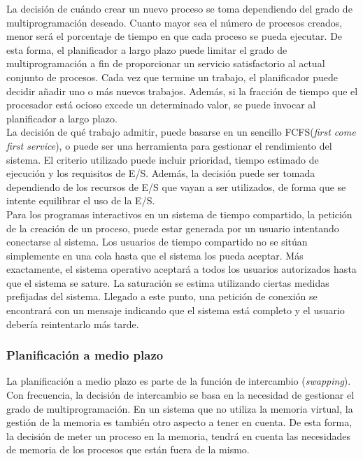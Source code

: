 \documentclass{article}
\begin{document}
				La decisión de cuándo crear un nuevo proceso se toma dependiendo del grado de multiprogramación deseado. Cuanto mayor sea el número de procesos creados, menor será el porcentaje de tiempo en que cada proceso se pueda ejecutar. De esta forma, el planificador a largo plazo puede limitar el grado de multiprogramación a fin de proporcionar un servicio satisfactorio al actual conjunto de procesos. Cada vez que termine un trabajo, el planificador puede decidir añadir uno o más nuevos trabajos. Además, si la fracción de tiempo que el procesador está ocioso excede un determinado valor, se puede invocar al planificador a largo plazo. \\
				
				La decisión de qué trabajo admitir, puede basarse en un sencillo FCFS(\textit{first come first service}), o puede ser una herramienta para gestionar el rendimiento del sistema. El criterio utilizado puede incluir prioridad, tiempo estimado de ejecución y los requisitos de E/S. Además, la decisión puede ser tomada dependiendo de los recursos de E/S que vayan a ser utilizados, de forma que se intente equilibrar el uso de la E/S. \\
				
				Para los programas interactivos en un sistema de tiempo compartido, la petición de la creación de un proceso, puede estar generada por un usuario intentando conectarse al sistema. Los usuarios de tiempo compartido no se sitúan simplemente en una cola hasta que el sistema los pueda aceptar. Más exactamente, el sistema operativo aceptará a todos los usuarios autorizados hasta que el sistema se sature. La saturación se estima utilizando ciertas medidas prefijadas del sistema. Llegado a este punto, una petición de conexión se encontrará con un mensaje indicando que el sistema está completo y el usuario debería reintentarlo más tarde. 
				
			\subsubsection{Planificación a medio plazo}
				La planificación a medio plazo es parte de la función de intercambio (\textit{swapping}). Con frecuencia, la decisión de intercambio se basa en la necesidad de gestionar el grado de multiprogramación. En un sistema que no utiliza la memoria virtual, la gestión de la memoria es también otro aspecto a tener en cuenta. De esta forma, la decisión de meter un proceso en la memoria, tendrá en cuenta las necesidades de memoria de los procesos que están fuera de la mismo.
			
\end{document}

